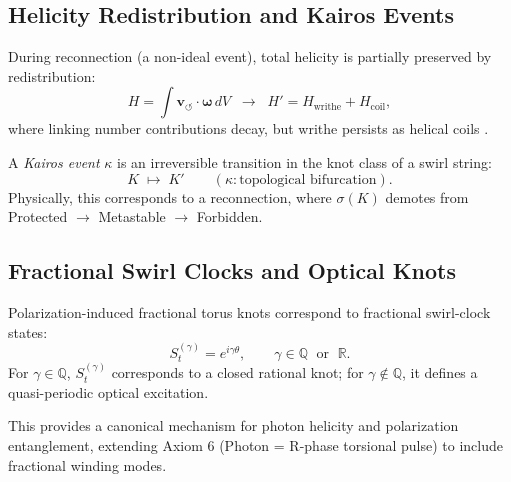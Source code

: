 \documentclass[10pt,reprint,aps,onecolumn,nofootinbib]{revtex4-2}
\begin{document}
\subsection{Helicity Redistribution and Kairos Events}

\begin{axiom}
    During reconnection (a non-ideal event), total helicity is partially preserved by redistribution:
    \[
        H = \int \mathbf{v}_{\!\boldsymbol{\circlearrowleft}} \cdot \boldsymbol{\omega}\, dV
        \;\;\longrightarrow\;\;
        H' = H_{\text{writhe}} + H_{\text{coil}} ,
    \]
    where linking number contributions decay, but writhe persists as helical coils \cite{Ricca1996,Kleckner2016}.
\end{axiom}

\begin{definition}
    A \emph{Kairos event} $\kappa$ is an irreversible transition in the knot class of a swirl string:
    \[
        K \;\mapsto\; K' \qquad (\kappa: \text{topological bifurcation}).
    \]
    Physically, this corresponds to a reconnection, where $\sigma(K)$ demotes from Protected $\to$ Metastable $\to$ Forbidden.
\end{definition}

\subsection{Fractional Swirl Clocks and Optical Knots}

\begin{theorem}
    Polarization-induced fractional torus knots correspond to fractional swirl-clock states:
    \[
        S_t^{(\gamma)} = e^{i \gamma \theta}, \qquad \gamma \in \mathbb{Q}\;\text{ or }\;\mathbb{R}.
    \]
    \]
    For $\gamma \in \mathbb{Q}$, $S_t^{(\gamma)}$ corresponds to a closed rational knot; for $\gamma \notin \mathbb{Q}$, it defines a quasi-periodic optical excitation.
\end{theorem}

This provides a canonical mechanism for photon helicity and polarization entanglement, extending Axiom 6 (Photon = R-phase torsional pulse) to include fractional winding modes.

\end{document}
